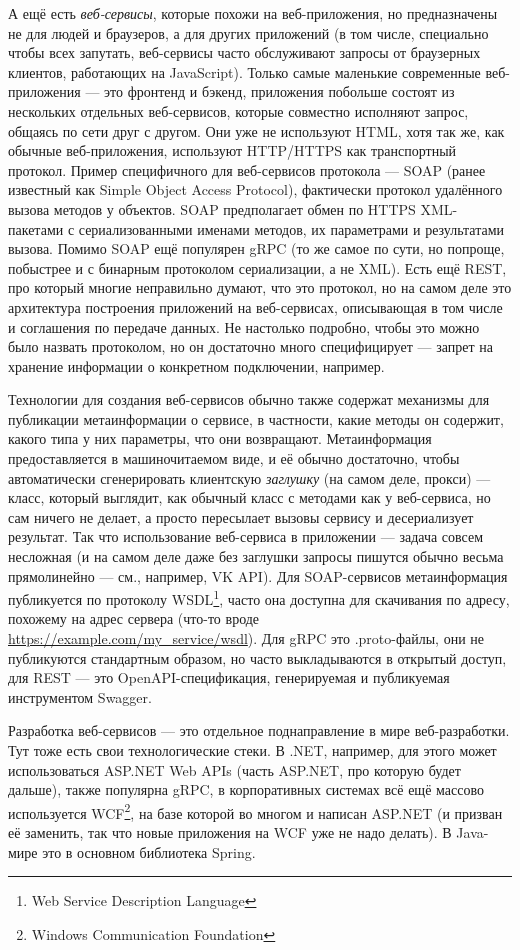 \documentclass[a5paper]{article}
\begin{document}
А ещё есть \emph{веб-сервисы}, которые похожи на веб-приложения, но предназначены не для людей и браузеров, а для других приложений (в том числе, специально чтобы всех запутать, веб-сервисы часто обслуживают запросы от браузерных клиентов, работающих на JavaScript). Только самые маленькие современные веб-приложения --- это фронтенд и бэкенд, приложения побольше состоят из нескольких отдельных веб-сервисов, которые совместно исполняют запрос, общаясь по сети друг с другом. Они уже не используют HTML, хотя так же, как обычные веб-приложения, используют HTTP/HTTPS как транспортный протокол. Пример специфичного для веб-сервисов протокола --- SOAP (ранее известный как Simple Object Access Protocol), фактически протокол удалённого вызова методов у объектов. SOAP предполагает обмен по HTTPS XML-пакетами с сериализованными именами методов, их параметрами и результатами вызова. Помимо SOAP ещё популярен gRPC (то же самое по сути, но попроще, побыстрее и с бинарным протоколом сериализации, а не XML). Есть ещё REST, про который многие неправильно думают, что это протокол, но на самом деле это архитектура построения приложений на веб-сервисах, описывающая в том числе и соглашения по передаче данных. Не настолько подробно, чтобы это можно было назвать протоколом, но он достаточно много специфицирует --- запрет на хранение информации о конкретном подключении, например.

Технологии для создания веб-сервисов обычно также содержат механизмы для публикации метаинформации о сервисе, в частности, какие методы он содержит, какого типа у них параметры, что они возвращают. Метаинформация предоставляется в машиночитаемом виде, и её обычно достаточно, чтобы автоматически сгенерировать клиентскую \emph{заглушку} (на самом деле, прокси) --- класс, который выглядит, как обычный класс с методами как у веб-сервиса, но сам ничего не делает, а просто пересылает вызовы сервису и десериализует результат. Так что использование веб-сервиса в приложении --- задача совсем несложная (и на самом деле даже без заглушки запросы пишутся обычно весьма прямолинейно --- см., например, VK API). Для SOAP-сервисов метаинформация публикуется по протоколу WSDL\footnote{Web Service Description Language}, часто она доступна для скачивания по адресу, похожему на адрес сервера (что-то вроде \url{https://example.com/my_service/wsdl}). Для gRPC это .proto-файлы, они не публикуются стандартным образом, но часто выкладываются в открытый доступ, для REST --- это OpenAPI-спецификация, генерируемая и публикуемая инструментом Swagger.

Разработка веб-сервисов --- это отдельное поднаправление в мире веб-разработки. Тут тоже есть свои технологические стеки. В .NET, например, для этого может использоваться ASP.NET Web APIs (часть ASP.NET, про которую будет дальше), также популярна gRPC, в корпоративных системах всё ещё массово используется WCF\footnote{Windows Communication Foundation}, на базе которой во многом и написан ASP.NET (и призван её заменить, так что новые приложения на WCF уже не надо делать). В Java-мире это в основном библиотека Spring.
\end{document}
